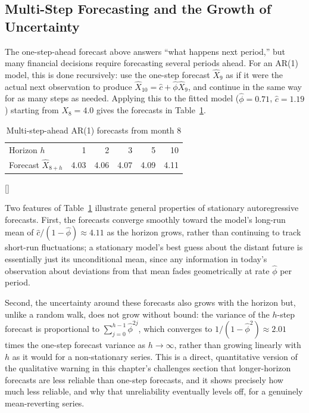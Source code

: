 \documentclass[../ai_in_finance]{subfiles}
\begin{document}
\subsection{Multi-Step Forecasting and the Growth of Uncertainty}

The one-step-ahead forecast above answers ``what happens next period,'' but many financial decisions require forecasting several periods ahead. For an AR(1) model, this is done recursively: use the one-step forecast $\hat X_9$ as if it were the actual next observation to produce $\hat X_{10} = \hat c + \hat\phi \hat X_9$, and continue in the same way for as many steps as needed. Applying this to the fitted model ($\hat\phi=0.71$, $\hat c=1.19$) starting from $X_8=4.0$ gives the forecasts in Table~\ref{tab:multistep}.

\begin{table}[htbp]
\centering
\begin{lrbox}{\bookmeasuredbox}
\begin{tabular}{lrrrrr}
\toprule
Horizon $h$ & 1 & 2 & 3 & 5 & 10 \\
Forecast $\hat X_{8+h}$ & 4.03 & 4.06 & 4.07 & 4.09 & 4.11 \\
\bottomrule
\end{tabular}
\end{lrbox}
\ifdim\wd\bookmeasuredbox<0.65\linewidth
\setlength{\bookcapwidth}{0.65\linewidth}
\else
\setlength{\bookcapwidth}{\wd\bookmeasuredbox}
\fi
{}[\bookcapwidth]{
\usebox{\bookmeasuredbox}
}{
\caption{Multi-step-ahead AR(1) forecasts from month 8}
\label{tab:multistep}
}
\end{table}

Two features of Table~\ref{tab:multistep} illustrate general properties of stationary autoregressive forecasts. First, the forecasts converge smoothly toward the model's long-run mean of $\hat c/(1-\hat\phi) \approx 4.11$ as the horizon grows, rather than continuing to track short-run fluctuations; a stationary model's best guess about the distant future is essentially just its unconditional mean, since any information in today's observation about deviations from that mean fades geometrically at rate $\hat\phi$ per period.

Second, the uncertainty around these forecasts also grows with the horizon but, unlike a random walk, does not grow without bound: the variance of the $h$-step forecast is proportional to $\sum_{j=0}^{h-1} \hat\phi^{2j}$, which converges to $1/(1-\hat\phi^2) \approx 2.01$ times the one-step forecast variance as $h \to \infty$, rather than growing linearly with $h$ as it would for a non-stationary series. This is a direct, quantitative version of the qualitative warning in this chapter's challenges section that longer-horizon forecasts are less reliable than one-step forecasts, and it shows precisely how much less reliable, and why that unreliability eventually levels off, for a genuinely mean-reverting series.
\end{document}
